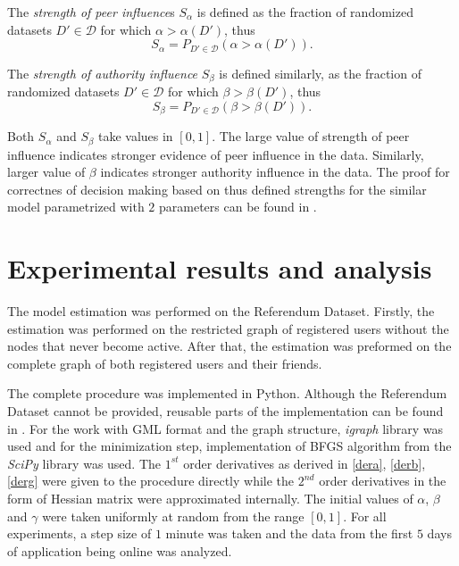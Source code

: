 \documentclass[times, utf8, zavrsni]{fer}
\begin{document}
The \emph{strength of peer influence}s $S_{\alpha}$ is defined as the fraction of randomized datasets $D' \in \mathcal{D}$ for which $\alpha > \alpha(D')$, thus
\begin{equation}
S_{\alpha} = P_{D' \in \mathcal{D}} (\alpha > \alpha(D')).
\end{equation}

The \emph{strength of authority influence} $S_{\beta}$ is defined similarly, as the fraction of randomized datasets $D' \in \mathcal{D}$ for which $\beta > \beta(D')$, thus
\begin{equation}
S_{\beta} = P_{D' \in \mathcal{D}} (\beta > \beta(D')).
\end{equation}

 Both $S_{\alpha}$ and $S_{\beta}$ take values in $[0, 1]$. The large value of strength of peer influence indicates stronger  evidence of peer influence in the data. Similarly, larger value of $\beta$ indicates stronger authority influence in the data. The proof for correctnes of decision making based on thus defined strengths for the similar model parametrized with $2$ parameters can be found in \cite{akm-icsn-kdd08}.

\chapter{Experimental results and analysis}

The model estimation was performed on the Referendum Dataset. Firstly, the estimation was performed on the restricted graph of registered users without the nodes that never become active. After  that, the estimation was preformed on the complete graph of both registered users and their friends.

The complete procedure was implemented in Python. Although the Referendum Dataset cannot be provided, reusable parts of the implementation can be found in \cite{code}. For the work with GML \cite{gml} format and the graph structure,  \emph{igraph} library \cite{igraph} was used and for the minimization step, implementation of BFGS algorithm from the \emph{SciPy} library \cite{scipy} was used. The $1^{st}$ order derivatives as derived in \eqref{dera}, \eqref{derb}, \eqref{derg}  were given to the procedure directly while the $2^{nd}$ order derivatives in the form of Hessian matrix were approximated internally. The initial values of $\alpha$, $\beta$ and $\gamma$ were taken uniformly at random from the range $[0, 1]$. For all experiments, a step size of $1$ minute was taken and the data from the first $5$  days of application being online was analyzed.
\end{document}
